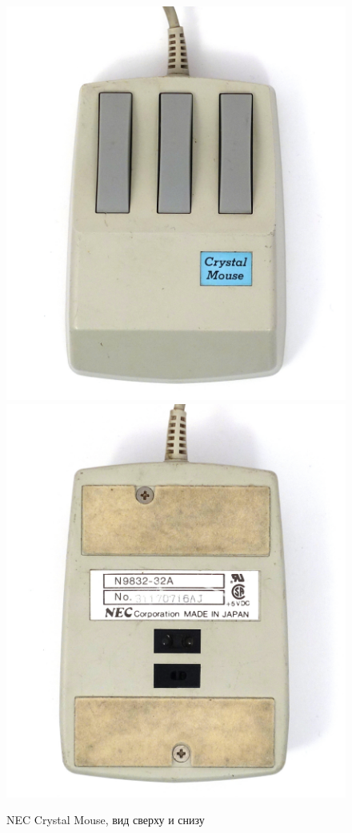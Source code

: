 \documentclass[11pt, a4paper]{article}
\begin{document}
\begin{figure}[h]
    \centering
    \includegraphics[scale=0.4]{1986_nec_crystal_mouse/nectop_60.jpg}
    \includegraphics[scale=0.4]{1986_nec_crystal_mouse/necbottom_60.jpg}
    \caption{NEC Crystal Mouse, вид сверху и снизу}
    \label{NecCrystalTopAndBottom}
\end{figure}
\end{document}
